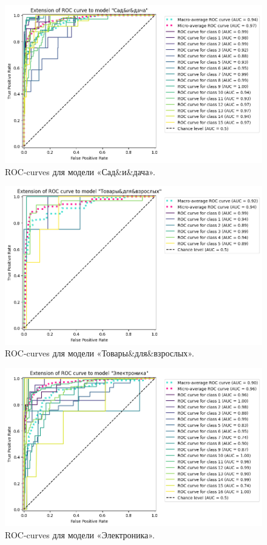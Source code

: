 \documentclass[a4paper,12pt]{extarticle}
\begin{document}
\begin{figure}[hbtp]
	\centering
	\includegraphics[scale=0.7]{roc_curves/roccurve_Сад&и&дача.png}
	\caption{ROC-curves для модели «Сад\&и\&дача».}
	\label{fig:roccurve_Сад&и&дача}
\end{figure}

\begin{figure}[hbtp]
	\centering
	\includegraphics[scale=0.7]{roc_curves/roccurve_Товары&для&взрослых.png}
	\caption{ROC-curves для модели «Товары\&для\&взрослых».}
	\label{fig:roccurve_Товары&для&взрослых}
\end{figure}

\begin{figure}[hbtp]
	\centering
	\includegraphics[scale=0.7]{roc_curves/roccurve_Электроника.png}
	\caption{ROC-curves для модели «Электроника».}
	\label{fig:roccurve_Электроника}
\end{figure}
\end{document}
